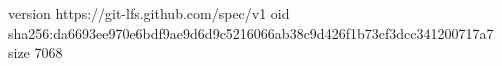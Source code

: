 version https://git-lfs.github.com/spec/v1
oid sha256:da6693ee970e6bdf9ae9d6d9c5216066ab38c9d426f1b73cf3dcc341200717a7
size 7068
